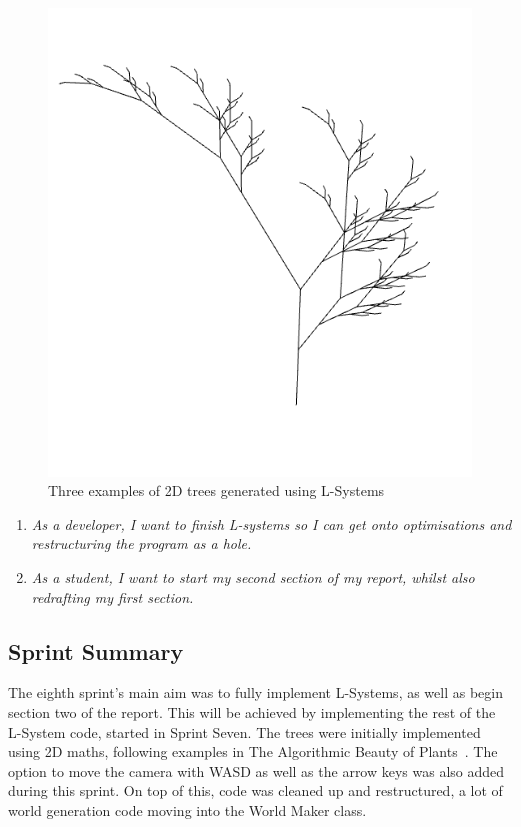 \documentclass[a4paper,10pt]{report}
\begin{document}
\begin{figure}[h!]
\begin{minipage}{.3\textwidth}
\end{minipage}
\begin{minipage}{.3\textwidth}
  \centering
  \includegraphics[width=.9\linewidth]{tree3.png}
\end{minipage}
\caption{Three examples of 2D trees generated using L-Systems}
\end{figure}
\begin{enumerate}
\subsection{Sprint Goals}

\item \textit{As a developer, I want to finish L-systems so I can get onto optimisations and restructuring the program as a hole.}

\item \textit{As a student, I want to start my second section of my report, whilst also redrafting my first section.}
\end{enumerate}

\subsection{Sprint Summary}

The eighth sprint's main aim was to fully implement L-Systems, as well as begin section two of the report. This will be achieved by implementing the rest of the L-System code, started in Sprint Seven. The trees were initially implemented using 2D maths, following examples in The Algorithmic Beauty of Plants~\cite{prusinkiewicz2012algorithmic}. The option to move the camera with WASD as well as the arrow keys was also added during this sprint. On top of this, code was cleaned up and restructured, a lot of world generation code moving into the World Maker class.
\end{document}
